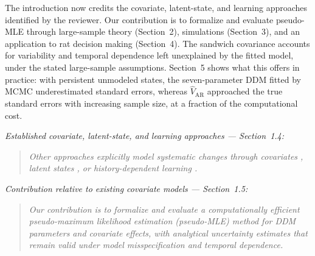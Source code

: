 \documentclass[00-main.tex]{subfiles}
\newcommand{\manuscriptquote}[1]{\begin{quote}\textit{#1}\end{quote}}
\begin{document}
The introduction now credits the covariate, latent-state, and learning approaches identified by the reviewer. Our contribution is to formalize and evaluate pseudo-MLE through large-sample theory (Section~2), simulations (Section~3), and an application to rat decision making (Section~4). The sandwich covariance accounts for variability and temporal dependence left unexplained by the fitted model, under the stated large-sample assumptions. Section~5 shows what this offers in practice: with persistent unmodeled states, the seven-parameter DDM fitted by MCMC underestimated standard errors, whereas $\widehat{V}_\text{AR}$ approached the true standard errors with increasing sample size, at a fraction of the computational cost.

\emph{Established covariate, latent-state, and learning approaches --- Section~1.4:}

\manuscriptquote{Other approaches explicitly model systematic changes through covariates \citep{cochrane_multiple_2023, alister_diffusion_2026}, latent states \citep{gunawan_time-evolving_2022, kucharsky_hidden_2021}, or history-dependent learning \citep{miletic_explaining_2025, pedersen_drift_2017, fontanesi_reinforcement_2019}.}

\emph{Contribution relative to existing covariate models --- Section~1.5:}

\manuscriptquote{Our contribution is to formalize and evaluate a computationally efficient pseudo-maximum likelihood estimation (pseudo-MLE) method for DDM parameters and covariate effects, with analytical uncertainty estimates that remain valid under model misspecification and temporal dependence.}

\end{document}
